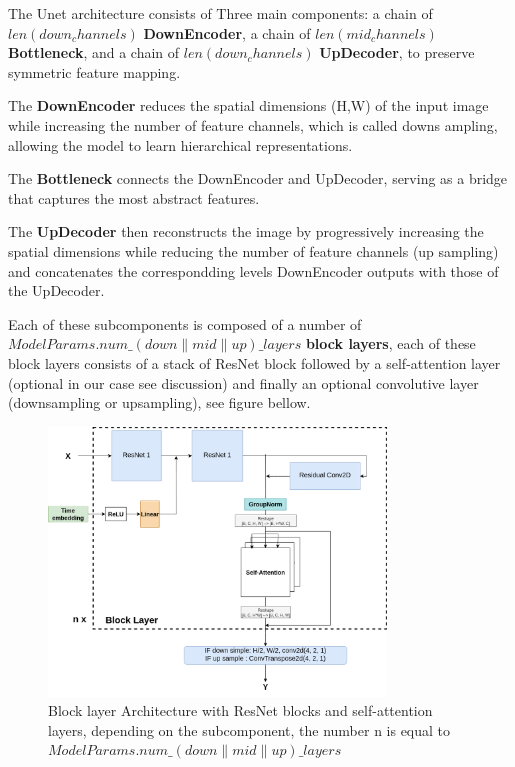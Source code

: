\documentclass[twocolumn,superscriptaddress,aps]{revtex4-1}
\begin{document}
The Unet architecture consists of Three main components: a chain of $len(down_channels)$ \textbf{DownEncoder}, a chain of $len(mid_channels)$ \textbf{Bottleneck}, and a chain of $len(down_channels)$ \textbf{UpDecoder}, to preserve symmetric feature mapping.

The \textbf{DownEncoder} reduces the spatial dimensions (H,W) of the input image while increasing the number of feature channels, which is called downs ampling, allowing the model to learn hierarchical representations.

The \textbf{Bottleneck} connects the DownEncoder and UpDecoder, serving as a bridge that captures the most abstract features.

The \textbf{UpDecoder} then reconstructs the image by progressively increasing the spatial dimensions while reducing the number of feature channels (up sampling) and concatenates the correspondding levels DownEncoder outputs with those of the UpDecoder.

Each of these subcomponents is composed of a number of \small{$ModelParams.num\_(down\|mid\|up)\_layers$} \textbf{block layers}, each of these block layers consists of a stack of ResNet block followed by a self-attention layer (optional in our case see discussion) and finally an optional convolutive layer (downsampling or upsampling), see figure bellow.

\begin{figure}[ht]
	\centering
	\includegraphics[width=0.8\textwidth]{figures/block_layer.png}
	\caption{Block layer Architecture with ResNet blocks and self-attention layers, depending on the subcomponent, the number n is equal to \small{$ModelParams.num\_(down\|mid\|up)\_layers$}}
	\label{fig:unet_architecture}
\end{figure}
\end{document}
